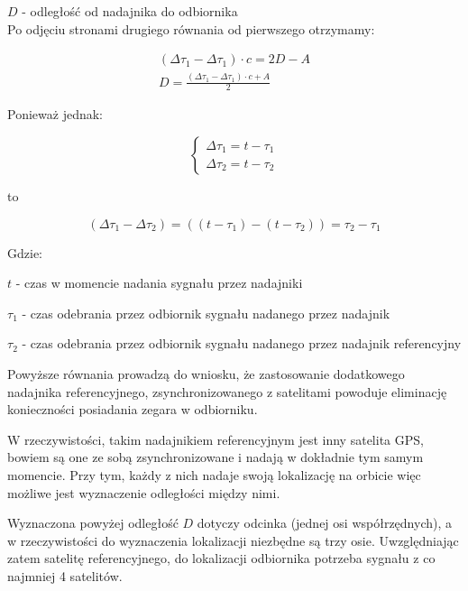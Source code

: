 $D$ - odległość od nadajnika do odbiornika\\

Po odjęciu stronami drugiego równania od pierwszego otrzymamy:

\begin{gather}
(\Delta \tau_1  - \Delta \tau_1) \cdot c = 2D - A \\
D = \frac{(\Delta \tau_1  - \Delta \tau_1) \cdot c + A}{2} \nonumber 
\end{gather}

Ponieważ jednak:

\begin{equation}
\begin{cases}
	\Delta \tau_1 = t - \tau_1 \\
	\Delta \tau_2 = t- \tau_2
\end{cases}
\end{equation}

to

\begin{equation}
(\Delta \tau_1 - \Delta \tau_2) = ((t - \tau_1) - (t - \tau_2)) = \tau_2 - \tau_1
\end{equation}

Gdzie:

$t$ - czas w momencie nadania sygnału przez nadajniki

$\tau_1$ - czas odebrania przez odbiornik sygnału nadanego przez nadajnik

$\tau_2$ - czas odebrania przez odbiornik sygnału nadanego przez nadajnik referencyjny 

Powyższe równania prowadzą do wniosku, że zastosowanie dodatkowego nadajnika referencyjnego, zsynchronizowanego z satelitami powoduje eliminację konieczności posiadania zegara w odbiorniku.

W rzeczywistości, takim nadajnikiem referencyjnym jest inny satelita GPS, bowiem są one ze sobą zsynchronizowane i nadają w dokładnie tym samym momencie. Przy tym, każdy z nich nadaje swoją lokalizację na orbicie więc możliwe jest wyznaczenie odległości między nimi.

Wyznaczona powyżej odległość $D$ dotyczy odcinka (jednej osi współrzędnych), a w rzeczywistości do wyznaczenia lokalizacji niezbędne są trzy osie. Uwzględniając zatem satelitę referencyjnego, do lokalizacji odbiornika potrzeba sygnału z co najmniej 4 satelitów.

